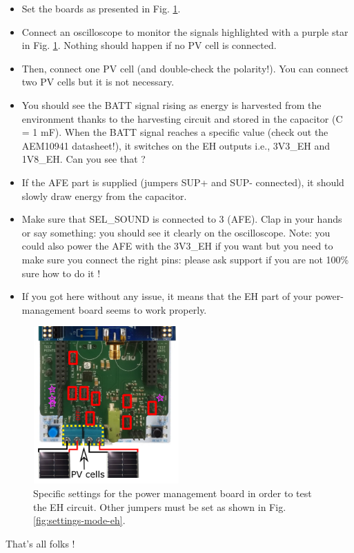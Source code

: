 \begin{itemize}
    \item Set the boards as presented in Fig. \ref{fig:testing-mode-eh}.
    \item Connect an oscilloscope to monitor the signals highlighted with a purple star in Fig. \ref{fig:testing-mode-eh}. Nothing should happen if no PV cell is connected.
    \item Then, connect one PV cell (and double-check the polarity!). You can connect two PV cells but it is not necessary.
    \item You should see the BATT signal rising as energy is harvested from the environment thanks to the harvesting circuit and stored in the capacitor (C = 1 mF). When the BATT signal reaches a specific value (check out the AEM10941 datasheet!), it switches on the EH outputs i.e., 3V3\_EH and 1V8\_EH. Can you see that ?
    \item If the AFE part is supplied (jumpers SUP+ and SUP- connected), it should slowly draw energy from the capacitor.
    \item Make sure that SEL\_SOUND is connected to 3 (AFE). Clap in your hands or say something: you should see it clearly on the oscilloscope. Note: you could also power the AFE with the 3V3\_EH if you want but you need to make sure you connect the right pins: please ask support if you are not 100\% sure how to do it !
    \item If you got here without any issue, it means that the EH part of your power-management board seems to work properly.
\end{itemize}

\begin{figure}[h!]
    \centering
    \includegraphics[width=0.5\textwidth]{figs/testing-EH.png}
    \caption{Specific settings for the power management board in order to test the EH circuit. Other jumpers must be set as shown in Fig. \ref{fig:settings-mode-eh}.}
    \label{fig:testing-mode-eh}
\end{figure}

\vspace{0.5cm}
\flushright
That's all folks !
